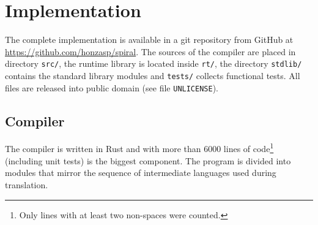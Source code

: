 \chapter{Implementation}

The complete implementation is available in a git repository from GitHub at
\url{https://github.com/honzasp/spiral}. The sources of the compiler are placed
in directory \texttt{src/}, the runtime library is located inside \texttt{rt/}, the
directory \texttt{stdlib/} contains the standard library modules and
\texttt{tests/} collects functional tests. All files are released into public
domain (see file \texttt{UNLICENSE}).

\section{Compiler}

The compiler is written in Rust \cite{rust} and with more than 6000 lines of
code\footnote{Only lines with at least two non-spaces were counted.} (including unit
tests) is the biggest component. The program is divided into modules that
mirror the sequence of intermediate languages used during translation.

